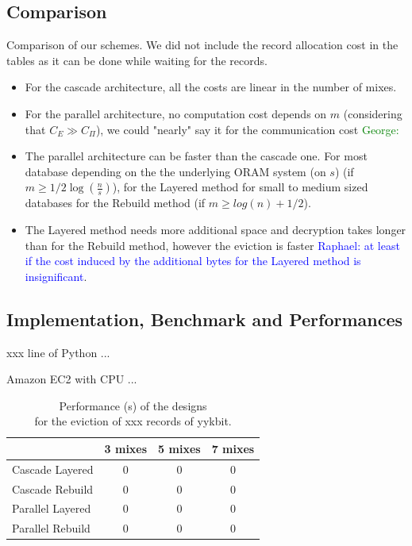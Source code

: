 \documentclass[USenglish,oneside,twocolumn]{article}
\newcommand{\raphael}[1]{\textcolor{blue}{Raphael: #1}}
\newcommand{\george}[1]{\textcolor{green}{George: #1}}
\begin{document}
\subsection{Comparison}\label{Comparison}
Comparison of our schemes.
We did not include the record allocation cost in the tables as it can be done while waiting for the records.

\begin{itemize}
	\item For the cascade architecture, all the costs are linear in the number of mixes.
	\item For the parallel architecture, no computation cost depends on $m$ (considering that $C_E \gg C_{\Pi}$), we could "nearly" say it for the communication cost \george{}
	\item The parallel architecture can be faster than the cascade one. For most database depending on the the underlying ORAM system (on $s$) (if $m \geq 1/2 \log(\frac{n}{s})$), for the Layered method for small to medium sized databases for the Rebuild method (if $m \geq log(n) +1/2$).
	\item The Layered method needs more additional space and decryption takes longer than for the Rebuild method, however the eviction is faster \raphael{at least if the cost induced by the additional bytes for the Layered method is insignificant}.
\end{itemize}

\subsection{Implementation, Benchmark and Performances}\label{Implementation}

xxx line of Python ...

Amazon EC2 with CPU ...


\begin{table}[H]
\vspace{0pt}
\centering
\begin{tabular}{l *3c}
\toprule
    					& 3 mixes	  	& 5 mixes		& 7 mixes	\\
\midrule
Cascade Layered  	& 0 				& 0 				& 0 			\\
Cascade Rebuild  	& 0 				& 0 				& 0 			\\
Parallel Layered 	& 0 				& 0 				& 0 			\\
Parallel Rebuild  	& 0 				& 0 				& 0 			\\
\bottomrule
\end{tabular}
\centering
\caption{Performance (s) of the designs \\ for the eviction of xxx records of yykbit.}
\end{table}
\end{document}
